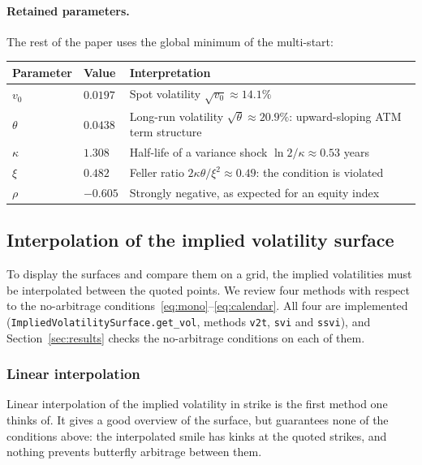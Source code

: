 \documentclass[11pt,a4paper]{article}
\theoremstyle{plain}
\theoremstyle{definition}
\begin{document}
\paragraph{Retained parameters.} The rest of the paper uses the global minimum of the multi-start:
\begin{center}
\begin{tabular}{@{}lll@{}}
\toprule
Parameter & Value & Interpretation \\
\midrule
$v_0$ & $0.0197$ & Spot volatility $\sqrt{v_0}\approx14.1\%$ \\
$\theta$ & $0.0438$ & Long-run volatility $\sqrt\theta\approx20.9\%$: upward-sloping ATM term structure \\
$\kappa$ & $1.308$ & Half-life of a variance shock $\ln2/\kappa\approx0.53$ years \\
$\xi$ & $0.482$ & Feller ratio $2\kappa\theta/\xi^2\approx0.49$: the condition is violated \\
$\rho$ & $-0.605$ & Strongly negative, as expected for an equity index \\
\bottomrule
\end{tabular}
\end{center}

\subsection{Interpolation of the implied volatility surface}
\label{sec:interp}
To display the surfaces and compare them on a grid, the implied volatilities must be interpolated between the quoted points. We review four methods with respect to the no-arbitrage conditions~\eqref{eq:mono}--\eqref{eq:calendar}. All four are implemented (\texttt{ImpliedVolatilitySurface.get\_vol}, methods \texttt{v2t}, \texttt{svi} and \texttt{ssvi}), and Section~\ref{sec:results} checks the no-arbitrage conditions on each of them.

\subsubsection{Linear interpolation}
Linear interpolation of the implied volatility in strike is the first method one thinks of. It gives a good overview of the surface, but guarantees none of the conditions above: the interpolated smile has kinks at the quoted strikes, and nothing prevents butterfly arbitrage between them.
\end{document}
